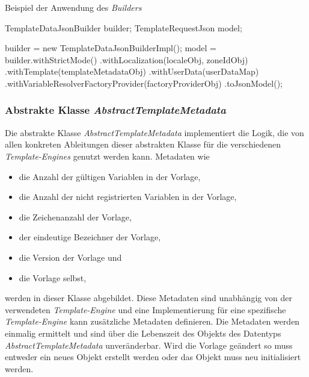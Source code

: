 \begin{program}[h]
\caption{Beispiel der Anwendung des \emph{Builders}}
\label{prog:templateDataJsonBuilder-example}
\begin{JavaCode}
TemplateDataJsonBuilder builder;
TemplateRequestJson     model;

builder = new TemplateDataJsonBuilderImpl();
model   = builder.withStrictMode() 
               .withLocalization(localeObj, zoneIdObj)
               .withTemplate(templateMetadataObj)
               .withUserData(userDataMap)
               .withVariableResolverFactoryProvider(factoryProviderObj)
               .toJsonModel();
\end{JavaCode}
\end{program}

\subsubsection{Abstrakte Klasse \emph{AbstractTemplateMetadata}}
\label{sec:abstractTemplateMetadata}
Die abstrakte Klasse \emph{AbstractTemplateMetadata} implementiert die Logik, die von allen konkreten Ableitungen dieser abstrakten Klasse für die verschiedenen \emph{Template-Engines} genutzt werden kann. Metadaten wie
\begin{itemize}
	\item die Anzahl der gültigen Variablen in der Vorlage,
	\item die Anzahl der nicht registrierten Variablen in der Vorlage,
	\item die Zeichenanzahl der Vorlage,
	\item der eindeutige Bezeichner der Vorlage,
	\item die Version der Vorlage und
	\item die Vorlage selbst,  
\end{itemize}
werden in dieser Klasse abgebildet.
\newline
\newline
Diese Metadaten sind unabhängig von der verwendeten \emph{Template-Engine} und eine Implementierung für eine spezifische \emph{Template-Engine} kann zusätzliche Metadaten definieren. Die Metadaten werden einmalig ermittelt und sind über die Lebenszeit des Objekts des Datentyps \emph{AbstractTemplateMetadata} unveränderbar. Wird die Vorlage geändert so muss entweder ein neues Objekt erstellt werden oder das Objekt muss neu initialisiert werden.

